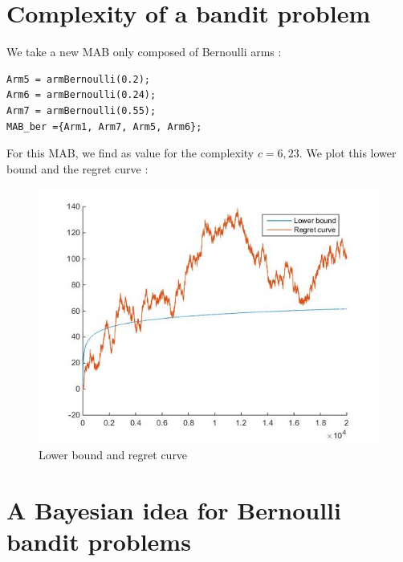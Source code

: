 \documentclass[11pt,a4paper]{article}
\begin{document}
\section{Complexity of a bandit problem}

We take a new MAB only composed of Bernoulli arms :
\begin{verbatim}
Arm5 = armBernoulli(0.2);
Arm6 = armBernoulli(0.24);
Arm7 = armBernoulli(0.55);
MAB_ber ={Arm1, Arm7, Arm5, Arm6};
\end{verbatim}

For this MAB, we find as value for the complexity $c = 6,23$.
We plot this lower bound and the regret curve :
\begin{figure}[H]
	\centering
	\noindent\includegraphics[scale=0.4]{complexity.jpg}
	\caption{Lower bound and regret curve}
\end{figure}

\section{A Bayesian idea for Bernoulli bandit problems}
\end{document}
